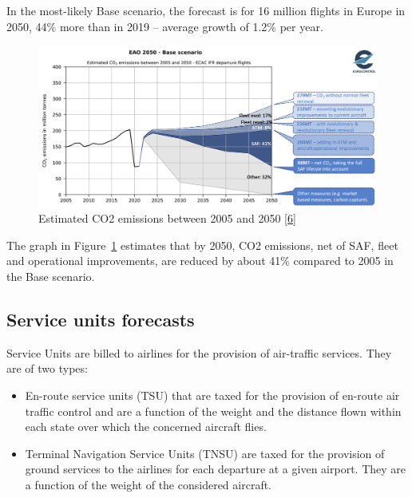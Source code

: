 \documentclass[
  11pt,
  a4paper,
]{book}
\begin{document}
In the most-likely Base scenario, the forecast is for 16 million flights
in Europe in 2050, 44\% more than in 2019 -- average growth of 1.2\% per
year.

\begin{figure}

{\centering \includegraphics{chapters/../figures/eao_2050_base_scenario.png}

}

\caption{\label{fig-co2-emissions-plot}Estimated CO2 emissions between
2005 and 2050 \protect\hyperlink{ref-aviation:outlook2022}{{[}6{]}}}

\end{figure}

The graph in Figure~\ref{fig-co2-emissions-plot} estimates that by 2050,
CO2 emissions, net of SAF, fleet and operational improvements, are
reduced by about 41\% compared to 2005 in the Base scenario.

\hypertarget{service-units-forecasts}{%
\subsection{Service units forecasts}\label{service-units-forecasts}}

Service Units are billed to airlines for the provision of air-traffic
services. They are of two types:

\begin{itemize}
\item
  En-route service units (TSU) that are taxed for the provision of
  en-route air traffic control and are a function of the weight and the
  distance flown within each state over which the concerned aircraft
  flies.
\item
  Terminal Navigation Service Units (TNSU) are taxed for the provision
  of ground services to the airlines for each departure at a given
  airport. They are a function of the weight of the considered aircraft.
\end{itemize}
\end{document}
